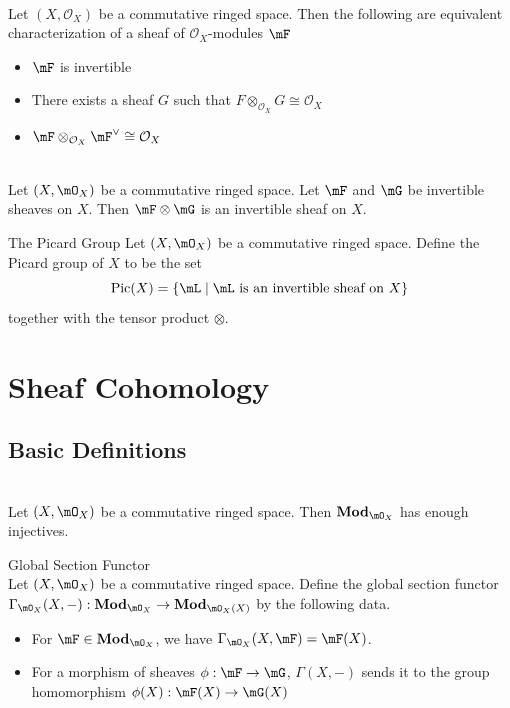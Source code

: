 \documentclass[a4paper]{article}
\begin{document}
\begin{prp}{}{}\\
Let $(X,\mathcal{O}_X)$ be a commutative ringed space. Then the following are equivalent characterization of a sheaf of $\mathcal{O}_X$-modules $\mF$
\begin{itemize}
\item $\mF$ is invertible
\item There exists a sheaf $G$ such that $F\otimes_{\mathcal{O}_X}G\cong\mathcal{O}_X$
\item $\mF\otimes_{\mathcal{O}_X}\mF^{\vee}\cong\mathcal{O}_X$
\end{itemize}
\end{prp}

\begin{prp}{}{}\\
Let $(X,\mO_X)$ be a commutative ringed space. Let $\mF$ and $\mG$ be invertible sheaves on $X$. Then $\mF\otimes\mG$ is an invertible sheaf on $X$. 
\end{prp}

\begin{defn}{The Picard Group}{} Let $(X,\mO_X)$ be a commutative ringed space. Define the Picard group of $X$ to be the set $$\text{Pic}(X)=\{\mL\;|\;\mL\text{ is an invertible sheaf on }X\}$$ together with the tensor product $\otimes$. 
\end{defn}

\pagebreak
\section{Sheaf Cohomology}
\subsection{Basic Definitions}
\begin{prp}{}{}\\
Let $(X,\mO_X)$ be a commutative ringed space. Then $\bold{Mod}_{\mO_X}$ has enough injectives. 
\end{prp}

\begin{defn}{Global Section Functor}{}\\
Let $(X,\mO_X)$ be a commutative ringed space. Define the global section functor $\Gamma_{\mO_X}(X,-):\bold{Mod}_{\mO_X}\to\bold{Mod}_{\mO_X(X)}$ by the following data. 
\begin{itemize}
\item For $\mF\in\bold{Mod}_{\mO_X}$, we have $\Gamma_{\mO_X}(X,\mF)=\mF(X)$. 
\item For a morphism of sheaves $\phi:\mF\to\mG$, $\Gamma(X,-)$ sends it to the group homomorphism $\phi(X):\mF(X)\to\mG(X)$
\end{itemize}
\end{defn}
\end{document}
